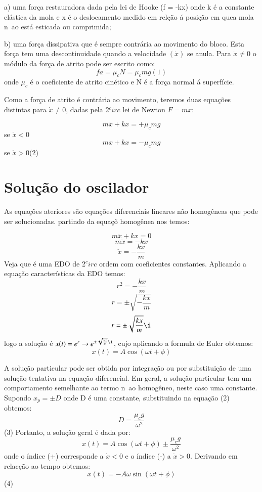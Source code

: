 \documentclass[a4paper]{article} %
\begin{document}
a) uma for\c{c}a restauradora dada pela lei de Hooke (f = -kx) onde k \'e a constante el\'astica da mola e x \'e o deslocamento medido em rel\c{c}\~ao \'a posi\c{c}\~ao em quea mola n~ao est\'a esticada ou comprimida;

b) uma for\c{c}a dissipativa que \'e sempre contr\'aria ao movimento do bloco. Esta for\c{c}a tem uma descontinuidade quando a velocidade $(\dot{x})$ se anula. Para $\dot{x} \neq 0$ o m\'odulo da for\c{c}a de atrito pode ser escrito como:
\[fa = \mu_cN = \mu_cmg (1)\]
onde $\mu_c$ \'e o coeficiente de atrito cin\'etico e N \'e a for\c{c}a normal \'a superf\'icie.

Como a for\c{c}a de atrito \'e contr\'aria ao movimento, teremos duas equa\c{c}\~oes distintas para $\dot{x} \neq 0$, dadas pela 2$^circ$ lei de Newton $F = m\ddot{x}$:

\[m\ddot{x} + kx = + \mu_cmg\] se $\dot{x} < 0$
\[m\ddot{x} + kx = - \mu_cmg\] se $\dot{x} > 0$(2)

\section{Solu\c{c}\~ao do oscilador}

As equa\c{c}\~oes ateriores s\~ao equa\c{c}\~oes diferenciais lineares n\~ao homog\^eneas que pode ser solucionadas.
partindo da equa\c{c}\~o homog\^enea nos temos:

\[m\ddot{x} + kx = 0\]
\[m\ddot{x} = - kx\]
\[\ddot{x} = -\frac{kx}{m}\]
Veja que \'e uma EDO de 2$^circ$ ordem com coeficientes constantes. Aplicando a equa\c{c}\~ao caracter\'isticas da EDO temos:
\[r^2 = -\frac{kx}{m}\] 
\[r = \pm \sqrt{-\frac{kx}{m}}\]
\[r = \pm \sqrt{\frac{kx}{m}}\i\]
logo a solu\c{c}\~ao \'e $x(t) = e^r \rightarrow e^{\pm \sqrt{\frac{kx}{m}}\i}$, cujo aplicando a formula de Euler obtemos:
\[x(t) = A\cos(\omega{t} + \phi)\]

A solu\c{c}\~ao particular pode ser obtida por integra\c{c}\~ao ou por substitui\c{c}\~ao de uma solu\c{c}\~ao tentativa na equa\c{c}\~ao diferencial. Em geral, a solu\c{c}\~ao particular tem um comportamento semelhante ao termo n~ao homog\^eneo, neste caso uma constante. Supondo $x_p = \pm D$ onde D \'e uma constante, substituindo na equa\c{c}\~ao (2) obtemos:
\[D = \frac{\mu_cg}{\omega^2}\] (3)
Portanto, a solu\c{c}\~ao geral \'e dada por:
\[x(t) = A\cos(\omega{t} + \phi) \pm \frac{\mu_cg}{\omega^2}\]
onde o \'indice (+) corresponde a $\dot{x} < 0$ e o \'indice (-) a $\dot{x} > 0$. Derivando em relac\c{c}\~ao ao tempo obtemos:
\[x(t) = -A\omega\sin(\omega{t} + \phi) \](4)
\end{document}
